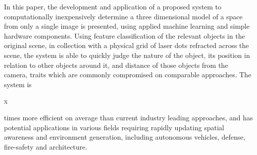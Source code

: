 In this paper, the development and application of a proposed system to computationally inexpensively determine a three dimensional model of a space from only a single image is presented, using applied machine learning and simple hardware components. Using feature classification of the relevant objects in the original scene, in collection with a physical grid of laser dots refracted across the scene, the system is able to quickly judge the nature of the object, its position in relation to other objects around it, and distance of those objects from the camera, traits which are commonly compromised on comparable approaches. The system is \begin{it}x\end{it} times more efficient on average than current industry leading approaches, and has potential applications in various fields requiring rapidly updating spatial awareness and environment generation, including autonomous vehicles, defense, fire-safety and architecture.